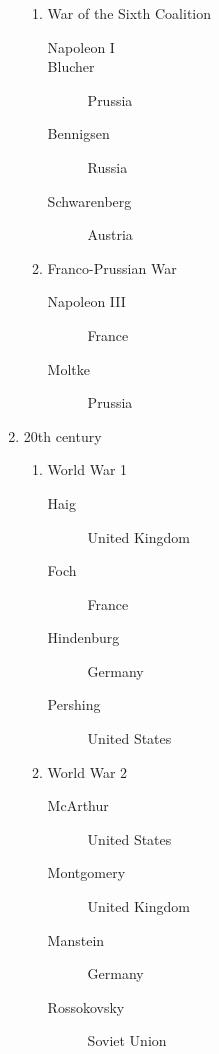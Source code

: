 \begin{enumerate}
        \begin{enumerate}
            \item{War of the Sixth Coalition}
            \begin{description}
                \item[Napoleon I]{}
                \item[Blucher]{Prussia}
                \item[Bennigsen]{Russia}
                \item[Schwarenberg]{Austria}
            \end{description}
            \item{Franco-Prussian War}
            \begin{description}
                \item[Napoleon III]{}France
                \item[Moltke]{Prussia}
            \end{description}
        \end{enumerate}
        \item{20th century}
        \begin{enumerate}
            \item{World War 1}
            \begin{description}
                \item[Haig]{United Kingdom}
                \item[Foch]{France}
            \item[Hindenburg]{Germany}
                \item[Pershing]{United States}
            \end{description}
            \item{World War 2}
            \begin{description}
                \item[McArthur]{United States}
                \item[Montgomery]{United Kingdom}
                \item[Manstein]{Germany}
                \item[Rossokovsky]{Soviet Union}
            \end{description}
        \end{enumerate}
    \end{enumerate}


